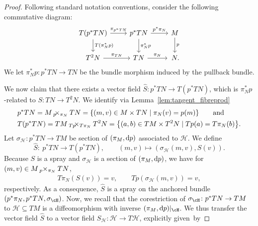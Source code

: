 \begin{proof}
Following standard notation conventions, consider the following commutative diagram:
\begin{displaymath}
\begin{tikzcd}
 T(p^{\ast} TN) \arrow[r, "\pi_{p^\ast TN}"] \arrow[d, "T(\pi_N^\ast p)"] & p^\ast TN \arrow[r,"p^\ast \pi_N"] \arrow[d,"\pi_N^\ast p"] & M \arrow[d,"p"] \\ T^2 N \arrow[r,"\pi_{TN}"] & TN \arrow[r,"\pi_N"] & \,N.
\end{tikzcd}
\end{displaymath}
We let $\pi_N^\ast p \colon p^\ast TN \rightarrow TN$ be the bundle morphism induced by the pullback bundle.

We now claim that there exists a vector field $\hat{S}\colon p^{*}TN \rightarrow T(p^{*}TN)$, which is $\pi^{*}_{N}p$-related to $S\colon TN \rightarrow T^{2}N$.
We identify via Lemma~\ref{lem:tangent_fibreprod}
\begin{align*}
 & p^{*}TN= M \, {}_{p}\hspace{-.5em}\times_{\pi_{N}} TN = \{ (m,v) \in M \times TN \mid \pi_{N}(v) = p(m)\} \qquad \text{and} \\
 & T(p^{*}TN)= TM\, {}_{Tp}\hspace{-.5em}\times_{T\pi_{N}} T^{2}N = \bigl\{ (a,b) \in TM \times T^{2}N \mid Tp(a) = T\pi_{N}(b) \bigr\}.
\end{align*}
Let $\sigma_{\mathcal{H}}\colon p^{*}TN \rightarrow TM$ be section of $(\pi_{M}, {\rm d}p)$ associated to $\mathcal{H}$.
We define
\begin{equation*}
 \hat{S}\colon\ p^{*}TN \rightarrow T(p^{*}TN), \qquad (m,v) \mapsto (\sigma_{\mathcal{H}}(m,v), S(v)).
\end{equation*}
Because $S$ is a spray and $\sigma_{\mathcal{H}}$ is a section of $(\pi_{M},{\rm d}p)$, we have for $(m,v) \in M \, {}_{p}\hspace{-.25em}\times_{\pi_{N}} TN$,
\begin{align*}
 T\pi_{N}(S(v)) = v, \qquad
 Tp(\sigma_{\mathcal{H}}(m,v)) = v,
\end{align*}
respectively.
As a consequence, $\hat{S}$ is a spray on the anchored bundle $(p^\ast\pi_N, p^\ast TN, \sigma_{\cH})$.
Now, we recall that the corestriction of $\sigma_\cH \colon p^\ast TN \rightarrow TM$ to $\mathcal{H} \subseteq TM$ is a diffeomorphism with inverse $(\pi_M,{\rm d}p)|_\cH$.
We thus transfer the vector field $\hat{S}$ to a vector field $S_{\mathcal{H}}\colon \mathcal{H} \rightarrow T\mathcal{H}$, explicitly given~by

\end{proof}
